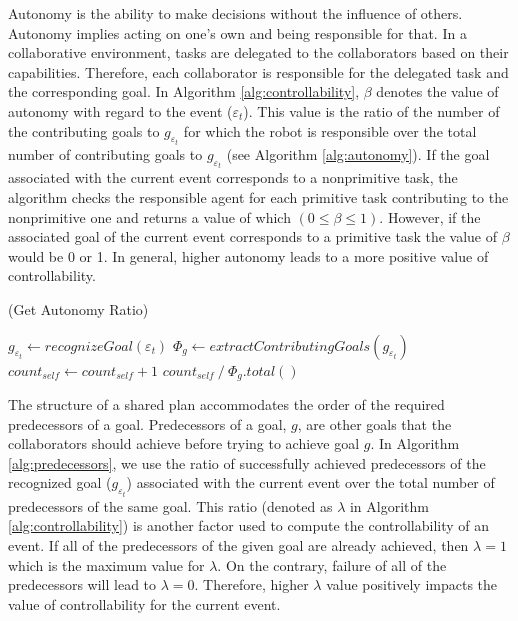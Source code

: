 \documentclass[letterpaper]{article}
\begin{document}
Autonomy is the ability to make decisions without the influence of others.
Autonomy implies acting on one's own and being responsible for that. In a
collaborative environment, tasks are delegated to the collaborators based on
their capabilities. Therefore, each collaborator is responsible for the
delegated task and the corresponding goal. In Algorithm
\ref{alg:controllability}, $\beta$ denotes the value of autonomy with regard to
the event ($\varepsilon_t$). This value is the ratio of the number of the
contributing goals to $\mathit{g}_{\varepsilon_t}$ for which the robot is
responsible over the total number of contributing goals to
$\mathit{g}_{\varepsilon_t}$ (see Algorithm \ref{alg:autonomy}). If the
goal associated with the current event corresponds to a nonprimitive task, the
algorithm checks the responsible agent for each primitive task contributing to
the nonprimitive one and returns a value of which $(0 \leq \beta \leq 1)$.
However, if the associated goal of the current event corresponds to a primitive
task the value of $\beta$ would be 0 or 1. In general, higher autonomy leads to
a more positive value of controllability.

\renewcommand\thealgorithm{4\alph{algorithm}}
\setcounter{algorithm}{1}

\begin{algorithm}
	\caption{(Get Autonomy Ratio)}
	\label{alg:autonomy}
	\begin{algorithmic}[1]
			\Statex
			\State $\mathit{g}_{\varepsilon_t} \gets \textit{recognizeGoal}{(\varepsilon_t)}$
			\Statex
				\State {}
			\EndIf
			\Statex
			\State $\Phi_{\mathit{g}} \gets
			\textit{extractContributingGoals}{(\mathit{g}_{\varepsilon_t})}$
			\Statex
					\State $count_{self} \gets count_{self} + 1$
				\EndIf
			\EndFor
			\Statex
			\State \Return 
			${count_{self} \mathbin{/} {{\Phi_{\mathit{g}}}.total()}}$
		\EndFunction 
	\end{algorithmic}
\end{algorithm}

The structure of a shared plan accommodates the order of the required
predecessors of a goal. Predecessors of a goal, $g$, are other goals that
the collaborators should achieve before trying to achieve goal $g$. In Algorithm
\ref{alg:predecessors}, we use the ratio of successfully achieved predecessors
of the recognized goal ($\mathit{g}_{\varepsilon_t}$) associated with the
current event over the total number of predecessors of the same goal. This ratio
(denoted as $\lambda$ in Algorithm \ref{alg:controllability}) is another factor
used to compute the controllability of an event. If all of the predecessors of
the given goal are already achieved, then $\lambda=1$ which is the maximum value
for $\lambda$. On the contrary, failure of all of the predecessors will lead to
$\lambda=0$. Therefore, higher $\lambda$ value positively impacts the value of
controllability for the current event.
\end{document}
